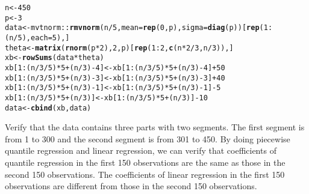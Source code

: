\documentclass[article]{jss}\usepackage[]{graphicx}\usepackage[]{xcolor}
\makeatletter
\newcommand{\hlnum}[1]{\textcolor[rgb]{0.686,0.059,0.569}{#1}}%
\newcommand{\hlopt}[1]{\textcolor[rgb]{0,0,0}{#1}}%
\newcommand{\hlstd}[1]{\textcolor[rgb]{0.345,0.345,0.345}{#1}}%
\newcommand{\hlkwb}[1]{\textcolor[rgb]{0.69,0.353,0.396}{#1}}%
\newcommand{\hlkwc}[1]{\textcolor[rgb]{0.333,0.667,0.333}{#1}}%
\newcommand{\hlkwd}[1]{\textcolor[rgb]{0.737,0.353,0.396}{\textbf{#1}}}%
\newenvironment{kframe}{%
 \def\at@end@of@kframe{}%
 \ifinner\ifhmode%
  \def\at@end@of@kframe{\end{minipage}}%
  \begin{minipage}{\columnwidth}%
 \fi\fi%
 \def\FrameCommand##1{\hskip\@totalleftmargin \hskip-\fboxsep
 \colorbox{shadecolor}{##1}\hskip-\fboxsep
     \hskip-\linewidth \hskip-\@totalleftmargin \hskip\columnwidth}%
 \MakeFramed {\advance\hsize-\width
   \@totalleftmargin\z@ \linewidth\hsize
   \@setminipage}}%
 {\par\unskip\endMakeFramed%
 \at@end@of@kframe}
\newenvironment{knitrout}{}{} %
\makeatother
\begin{document}
%
\begin{knitrout}
\color{fgcolor}\begin{kframe}
\begin{alltt}
\hlstd{n} \hlkwb{<-} \hlnum{450}
\hlstd{p} \hlkwb{<-} \hlnum{3}
\hlstd{data} \hlkwb{<-} \hlstd{mvtnorm}\hlopt{::}\hlkwd{rmvnorm}\hlstd{(n} \hlopt{/} \hlnum{5}\hlstd{,} \hlkwc{mean} \hlstd{=} \hlkwd{rep}\hlstd{(}\hlnum{0}\hlstd{, p),} \hlkwc{sigma} \hlstd{=} \hlkwd{diag}\hlstd{(p))[}\hlkwd{rep}\hlstd{(}\hlnum{1}\hlopt{:}\hlstd{(n} \hlopt{/} \hlnum{5}\hlstd{),} \hlkwc{each} \hlstd{=} \hlnum{5}\hlstd{), ]}
\hlstd{theta} \hlkwb{<-} \hlkwd{matrix}\hlstd{(}\hlkwd{rnorm}\hlstd{(p} \hlopt{*} \hlnum{2}\hlstd{),} \hlnum{2}\hlstd{, p)[}\hlkwd{rep}\hlstd{(}\hlnum{1}\hlopt{:}\hlnum{2}\hlstd{,} \hlkwd{c}\hlstd{(n} \hlopt{*} \hlnum{2} \hlopt{/} \hlnum{3}\hlstd{, n} \hlopt{/} \hlnum{3}\hlstd{)), ]}
\hlstd{xb} \hlkwb{<-} \hlkwd{rowSums}\hlstd{(data} \hlopt{*} \hlstd{theta)}
\hlstd{xb[}\hlnum{1}\hlopt{:}\hlstd{(n} \hlopt{/} \hlnum{3} \hlopt{/} \hlnum{5}\hlstd{)} \hlopt{*} \hlnum{5} \hlopt{+} \hlstd{(n} \hlopt{/} \hlnum{3}\hlstd{)} \hlopt{-} \hlnum{4}\hlstd{]} \hlkwb{<-} \hlstd{xb[}\hlnum{1}\hlopt{:}\hlstd{(n} \hlopt{/} \hlnum{3} \hlopt{/} \hlnum{5}\hlstd{)} \hlopt{*} \hlnum{5} \hlopt{+} \hlstd{(n} \hlopt{/} \hlnum{3}\hlstd{)} \hlopt{-} \hlnum{4}\hlstd{]} \hlopt{+} \hlnum{50}
\hlstd{xb[}\hlnum{1}\hlopt{:}\hlstd{(n} \hlopt{/} \hlnum{3} \hlopt{/} \hlnum{5}\hlstd{)} \hlopt{*} \hlnum{5} \hlopt{+} \hlstd{(n} \hlopt{/} \hlnum{3}\hlstd{)} \hlopt{-} \hlnum{3}\hlstd{]} \hlkwb{<-} \hlstd{xb[}\hlnum{1}\hlopt{:}\hlstd{(n} \hlopt{/} \hlnum{3} \hlopt{/} \hlnum{5}\hlstd{)} \hlopt{*} \hlnum{5} \hlopt{+} \hlstd{(n} \hlopt{/} \hlnum{3}\hlstd{)} \hlopt{-} \hlnum{3}\hlstd{]} \hlopt{+} \hlnum{40}
\hlstd{xb[}\hlnum{1}\hlopt{:}\hlstd{(n} \hlopt{/} \hlnum{3} \hlopt{/} \hlnum{5}\hlstd{)} \hlopt{*} \hlnum{5} \hlopt{+} \hlstd{(n} \hlopt{/} \hlnum{3}\hlstd{)} \hlopt{-} \hlnum{1}\hlstd{]} \hlkwb{<-} \hlstd{xb[}\hlnum{1}\hlopt{:}\hlstd{(n} \hlopt{/} \hlnum{3} \hlopt{/} \hlnum{5}\hlstd{)} \hlopt{*} \hlnum{5} \hlopt{+} \hlstd{(n} \hlopt{/} \hlnum{3}\hlstd{)} \hlopt{-} \hlnum{1}\hlstd{]} \hlopt{-} \hlnum{5}
\hlstd{xb[}\hlnum{1}\hlopt{:}\hlstd{(n} \hlopt{/} \hlnum{3} \hlopt{/} \hlnum{5}\hlstd{)} \hlopt{*} \hlnum{5} \hlopt{+} \hlstd{(n} \hlopt{/} \hlnum{3}\hlstd{)]} \hlkwb{<-} \hlstd{xb[}\hlnum{1}\hlopt{:}\hlstd{(n} \hlopt{/} \hlnum{3} \hlopt{/} \hlnum{5}\hlstd{)} \hlopt{*} \hlnum{5} \hlopt{+} \hlstd{(n} \hlopt{/} \hlnum{3}\hlstd{)]} \hlopt{-} \hlnum{10}
\hlstd{data} \hlkwb{<-} \hlkwd{cbind}\hlstd{(xb, data)}
\end{alltt}
\end{kframe}
\end{knitrout}
%
Verify that the data contains three parts with two segments. The first segment
is from 1 to 300 and the second segment is from 301 to 450. By doing piecewise
quantile regression and linear regression, we can verify that coefficients of
quantile regression in the first 150 observations are the same as those in the
second 150 observations. The coefficients of linear regression in the first 150
observations are different from those in the second 150 observations.
\end{document}
